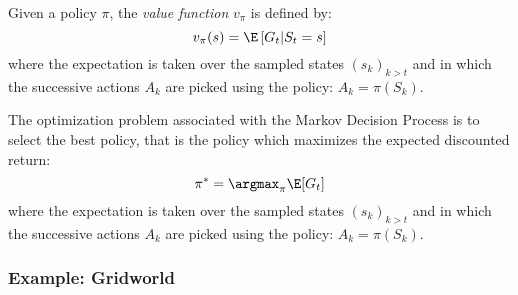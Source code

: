 \begin{definition}
    Given a policy $\pi$, the \emph{value function} $v_\pi$ is defined by:
    \begin{equation*}
        v_\pi(s) = \E\left[G_t|S_t=s\right]
    \end{equation*}
    where the expectation is taken over the sampled states $(s_k)_{k>t}$ and in which the successive actions $A_k$ are picked using the policy: $A_k=\pi(S_k)$.
\end{definition}



The optimization problem associated with the Markov Decision Process is to select the best policy, that is the policy which maximizes the expected discounted return:
\begin{equation}
    \pi^*=\argmax_\pi \E[G_t]
\end{equation}
where the expectation is taken over the sampled states $(s_k)_{k>t}$ and in which the successive actions $A_k$ are picked using the policy: $A_k=\pi(S_k)$.

\subsubsection{Example: Gridworld}